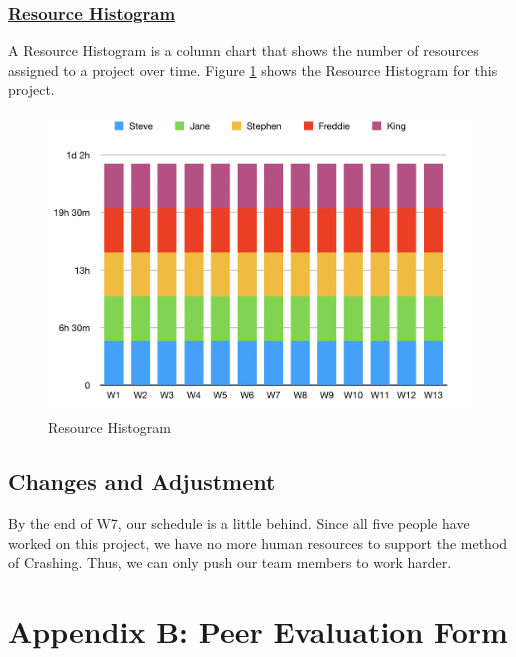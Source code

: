 \documentclass{article}
\begin{document}
\subsubsection*{\underline{Resource Histogram}}
A Resource Histogram is a column chart that shows the number of resources assigned to a project over time. Figure \ref{fig:Resource Histogram} shows the Resource Histogram for this project.
\begin{figure}[!htp]
    \centering
    \includegraphics[width=1\textwidth]{Resource Histogram.png}
    \caption{Resource Histogram}
    \label{fig:Resource Histogram}
\end{figure}
\begin{list}{}{\leftmargin=1em}
    \item \subsection*{Changes and Adjustment}
\end{list}
By the end of W7, our schedule is a little behind. Since all five people have worked on this project, we have no more human resources to support the method of Crashing. Thus, we can only push our team members to work harder. 
\clearpage
\section{Appendix B: Peer Evaluation Form}
\end{document}
